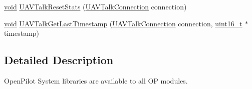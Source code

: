 \begin{DoxyCompactItemize}
\item 
\hyperlink{group___n_a_m_e_ga18028b8badbf1ea7e704ccac3c488e82}{void} \hyperlink{group___open_pilot_libraries_gafea32b2e3331f9e81f48979b0e6c0a0b}{U\-A\-V\-Talk\-Reset\-Stats} (\hyperlink{group___open_pilot_libraries_gaeff1721eaebd4ab306057b4017f23f36}{U\-A\-V\-Talk\-Connection} connection)
\item 
\hyperlink{group___n_a_m_e_ga18028b8badbf1ea7e704ccac3c488e82}{void} \hyperlink{group___open_pilot_libraries_ga4134f84aca917fe6e3eca1eaacf0664e}{U\-A\-V\-Talk\-Get\-Last\-Timestamp} (\hyperlink{group___open_pilot_libraries_gaeff1721eaebd4ab306057b4017f23f36}{U\-A\-V\-Talk\-Connection} connection, \hyperlink{stdint_8h_a273cf69d639a59973b6019625df33e30}{uint16\-\_\-t} $\ast$timestamp)
\end{DoxyCompactItemize}


\subsection{Detailed Description}
Open\-Pilot System libraries are available to all O\-P modules. 

